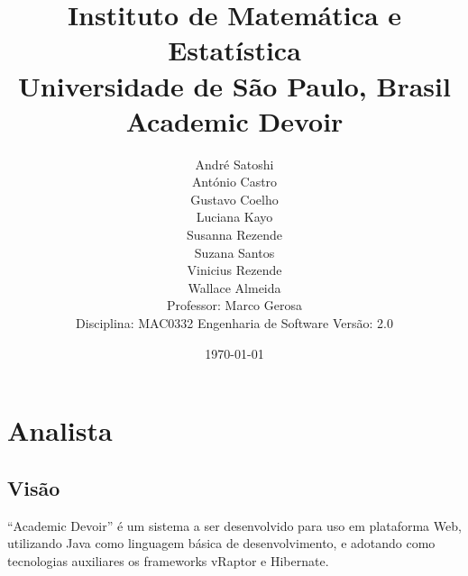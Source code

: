 \documentclass[12pt,letterpaper]{article}
\begin{document}
\sloppy



\title{
{\Large Instituto de Matemática e Estatística} \\
{\large Universidade de S\~ao Paulo, Brasil} \\
\vspace{2cm}
{\bf Academic Devoir}
}


\author{
André Satoshi\\
António Castro\\
Gustavo Coelho\\
Luciana Kayo\\
Susanna Rezende\\
Suzana Santos\\
Vinicius Rezende\\
\vspace{2cm}
Wallace Almeida\\
{\small Professor: Marco Gerosa}\\
{\small Disciplina: MAC0332 Engenharia de Software}
\vspace{2cm}
{\small Versão: 2.0}
}

\date{\today}

\maketitle

\thispagestyle{empty}


\pagebreak

\tableofcontents







\pagebreak
\section{Analista}

\subsection{Visão}
``Academic Devoir'' é um sistema a ser desenvolvido para uso em plataforma Web,  utilizando Java como linguagem básica de desenvolvimento, e adotando como tecnologias au\-xi\-liares os frameworks vRaptor e Hibernate.
\end{document}
